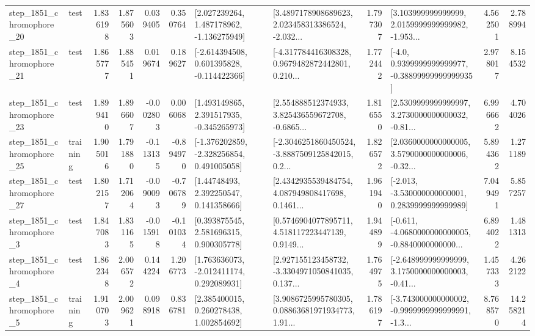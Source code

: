 \begin{tabular}{llrrrrllrlrr}
 step\_1851\_chromophore\_20 &      test &      1.836198 &    1.875603 &      0.039405 &  0.350764 &    [2.027239264, 1.487178962, -1.136275949] &  [3.4897178908689623, 2.023458313386524, -2.032... &       1.797307 &  [3.103999999999999, 2.0159999999999982, -1.953... &            4.562501 &          2.788994 \\
 step\_1851\_chromophore\_21 &      test &      1.865777 &    1.885451 &      0.019674 &  0.189627 &   [-2.614394508, 0.601395828, -0.114422366] &  [-4.317784416308328, 0.9679482872442801, 0.210... &       1.772442 &   [-4.0, 0.9399999999999977, -0.38899999999999935] &            2.978017 &          8.154532 \\
 step\_1851\_chromophore\_23 &      test &      1.899410 &    1.896607 &     -0.002803 &  0.006068 &    [1.493149865, 2.391517935, -0.345265973] &  [2.554888512374933, 3.825436559672708, -0.6865... &       1.816550 &  [2.5309999999999997, 3.2730000000000032, -0.81... &            6.996662 &          4.704026 \\
 step\_1851\_chromophore\_25 &  training &      1.905016 &    1.791880 &     -0.113135 & -0.894970 &   [-1.376202859, -2.328256854, 0.491005058] &  [-2.3046251860450524, -3.8887509125842015, 0.2... &       1.826572 &  [2.0360000000000005, 3.5790000000000006, -0.32... &            5.894362 &          1.271189 \\
 step\_1851\_chromophore\_27 &      test &      1.802157 &    1.712064 &     -0.090093 & -0.706789 &      [1.44748493, 2.392250547, 0.141358666] &  [2.4342935539484754, 4.087949808417698, 0.1461... &       1.961940 &   [-2.013, -3.530000000000001, 0.2839999999999989] &            7.049491 &          5.857257 \\
  step\_1851\_chromophore\_3 &      test &      1.847083 &    1.831165 &     -0.015918 & -0.101034 &     [0.393875545, 2.581696315, 0.900305778] &  [0.5746904077895711, 4.518117223447139, 0.9149... &       1.944899 &  [-0.611, -4.0680000000000005, -0.8840000000000... &            6.894022 &          1.481313 \\
  step\_1851\_chromophore\_4 &      test &      1.862348 &    2.006572 &      0.144224 &  1.206773 &    [1.763636073, -2.012411174, 0.292089931] &  [2.927155123458732, -3.3304971050841035, 0.137... &       1.764975 &  [-2.648999999999999, 3.1750000000000003, -0.41... &            1.457333 &          4.262122 \\
  step\_1851\_chromophore\_5 &  training &      1.910703 &    2.009621 &      0.098918 &  0.836781 &     [2.385400015, 0.260278438, 1.002854692] &  [3.9086725995780305, 0.08863681971934773, 1.91... &       1.786197 &  [-3.743000000000002, -0.9999999999999991, -1.3... &            8.768570 &         14.258214 \\

\end{tabular}

